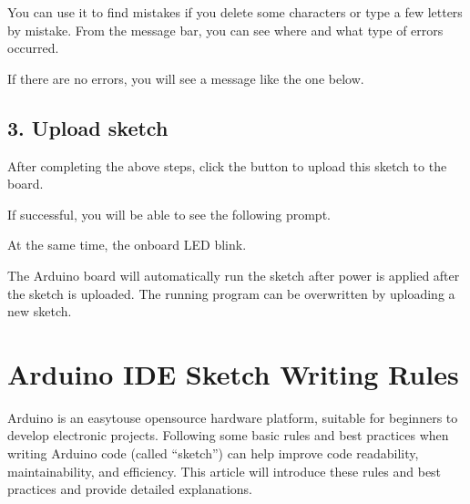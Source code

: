 \documentclass[a4paper,11pt,english]{sphinxmanual}
\let\sphinxpxdimen\pdfpxdimen\else\newdimen\sphinxpxdimen
\begin{document}
\sphinxAtStartPar
You can use it to find mistakes if you delete some characters or type a few letters by mistake. From the message bar, you can see where and what type of errors occurred.
\begin{quote}

\noindent{}
\end{quote}

\sphinxAtStartPar
If there are no errors, you will see a message like the one below.
\begin{quote}

\noindent{}
\end{quote}


\subsection{3. Upload sketch}
\label{\detokenize{Get_Started_with_Arduino/How_to_Upload_Sketch:upload-sketch}}
\sphinxAtStartPar
After completing the above steps, click the  button to upload this sketch to the board.
\begin{quote}

\noindent{}
\end{quote}

\sphinxAtStartPar
If successful, you will be able to see the following prompt.
\begin{quote}

\noindent{}
\end{quote}

\sphinxAtStartPar
At the same time, the on\sphinxhyphen{}board LED blink.

\noindent{\hspace*{\fill}\sphinxincludegraphics[width=400\sphinxpxdimen]{{Upload_Sketch8}.png}\hspace*{\fill}}



\sphinxAtStartPar
The Arduino board will automatically run the sketch after power is applied after the sketch is uploaded. The running program can be overwritten by uploading a new sketch.

\sphinxstepscope


\section{Arduino IDE Sketch Writing Rules}
\label{\detokenize{Get_Started_with_Arduino/Sketch_Writing_Rules:arduino-ide-sketch-writing-rules}}\label{\detokenize{Get_Started_with_Arduino/Sketch_Writing_Rules::doc}}
\sphinxAtStartPar
Arduino is an easy\sphinxhyphen{}to\sphinxhyphen{}use open\sphinxhyphen{}source hardware platform, suitable for beginners to develop electronic projects. Following some basic rules and best practices when writing Arduino code (called “sketch”) can help improve code readability, maintainability, and efficiency. This article will introduce these rules and best practices and provide detailed explanations.
\end{document}
